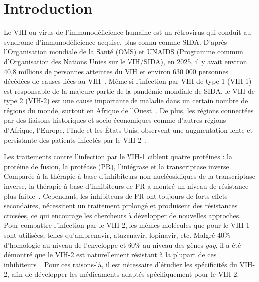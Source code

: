 \documentclass{isddmaster}
\begin{document}
	\vfill
	
	\newpage
	\tableofcontents
	\newpage
	
	\setcounter{page}{1}
	\section{Introduction}
	
	Le VIH ou virus de l'immunodéficience humaine est un rétrovirus qui conduit au syndrome d'immunodéficience acquise, plus connu comme SIDA. D'après l'Organisation mondiale de la Santé (OMS) et UNAIDS (Programme commun d'Organisation des Nations Unies sur le VIH/SIDA), en 2025, il y avait environ 40,8 millions de personnes atteintes du VIH et environ 630 000 personnes décédées de causes liées au VIH~\cite{noauthor_global_nodate}.
    Même si l'infection par VIH de type 1 (VIH-1) est responsable de la majeure partie de la pandémie mondiale de SIDA, le VIH de type 2 (VIH-2) est une cause importante de maladie dans un certain nombre de régions du monde, surtout en Afrique de l'Ouest~\cite{williams_geographic_2023,van_der_loeff_epidemiology_2008}. De plus, les régions connectées par des liaisons historiques et socio-économiques comme d'autres régions d'Afrique, l'Europe, l'Inde et les États-Unis, observent une augmentation lente et persistante des patients infectés par le VIH-2~\cite{barin_prevalence_2007,soriano_human_2000}. \par
    Les traitements contre l’infection par le VIH-1 ciblent quatre protéines : la protéine de fusion, la protéase (PR), l'intégrase et la transcriptase inverse. Comparée à la thérapie à base d'inhibiteurs non-nucléosidiques de la transcriptase inverse, la thérapie à base d'inhibiteurs de PR a montré un niveau de résistance plus faible~\cite{lv_hiv_2015}.
    Cependant, les inhibiteurs de PR ont toujours de forts effets secondaires, nécessitent un traitement prolongé et produisent des résistances croisées, ce qui encourage les chercheurs à développer de nouvelles approches.
    Pour combattre l'infection par le VIH-2, les mêmes molécules que pour le VIH-1 sont utilisées, telles qu'amprenavir, atazanavir, lopinavir, etc. Malgré 40\% d'homologie au niveau de l'enveloppe et 60\% au niveau des gènes \textit{gag}, il a été démontré que le VIH-2 est naturellement résistant à la plupart de ces inhibiteurs~\cite{desbois_vitro_2008,brower_inhibition_2008,menendez-arias_antiretroviral_2014}.
	Pour ces raisons-là, il est nécessaire d'étudier les spécificités du VIH-2, afin de développer les médicaments adaptés spécifiquement pour le VIH-2.\par
    
\end{document}
